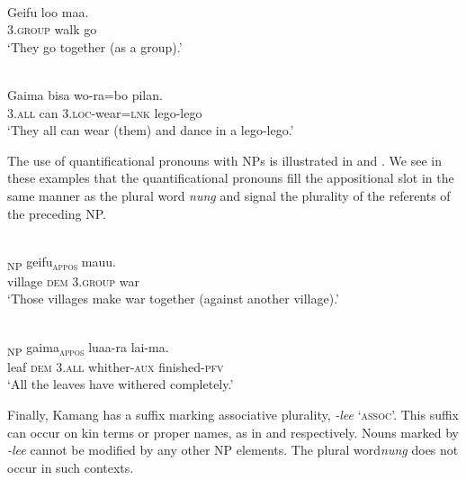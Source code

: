 \ea%
 \\
\label{ex:9:40}
\gll  Geifu   loo maa.  \\
  3.\textsc{group} walk go   \\
\glt `They go together (as a group).'
\z






\ea%
\label{ex:9:41}
 \\
\gll Gaima bisa wo-ra=bo pilan. \\
  3.\textsc{all} can   3.\textsc{loc}-wear=\textsc{lnk} lego-lego  \\
\glt `They all can wear (them) and dance in a lego-lego.'
\z






The use of quantificational pronouns with NPs is illustrated in  and . We see in these examples that the quantificational pronouns fill the appositional slot in the same manner as the plural word \textit{nung} and signal the plurality of the referents of the preceding NP.


\ea%
\label{ex:9:42}
 \\
\textsubscript{\textsc{NP}} {geifu}\textsubscript{\textsc{appos}}   {mauu.}\\
  village \textsc{dem} 3.\textsc{group} war  \\
\glt `Those villages make war together (against another village).'
\z






\ea%
\label{ex:9:43}
 \\
\textsubscript{NP} {gaima}\textsubscript{\textsc{appos}} luaa-ra lai-ma{.}\\
    leaf \textsc{dem}   3.\textsc{all} whither-\textsc{aux} finished-\textsc{pfv}\\
\glt `All the leaves have withered completely.'
\z






Finally, Kamang has a suffix marking associative plurality, \textit{-lee} `\textsc{assoc}'. This suffix can occur on kin terms or proper names, as in  and  respectively. Nouns marked by \textit{-lee} cannot be modified by any other NP elements. The plural word\textit{nung} does not occur in such contexts.


